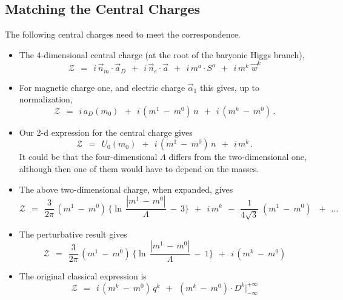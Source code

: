\documentclass[epsfig,12pt]{article}
\def\beq{\begin{equation}}
\def\eeq{\end{equation}}
\def\beq{\begin{equation}}
\def\eeq{\end{equation}}
\newcommand{\mc}[1]{\mathcal{#1}}
\begin{document}
\subsection{Matching the Central Charges}
\setcounter{equation}{0}

       The following central charges need to meet the correspondence.
\vspace{0.6cm}

\begin{itemize}
\item
       The 4-dimensional central charge (at the root of the baryonic Higgs branch),
\beq
       \mc{Z}  ~~=~~ i\, \vec{n}{}_m \cdot \vec{a}{}_D  ~~+~~ i\, \vec{n}{}_e \cdot \vec{a}  
               ~~+~~ i\, m^a \cdot S^a ~~+~~ i\, m^k \; \vec{w}^k
\eeq

\item
       For magnetic charge one, and electric charge $ \vec{\alpha}{}_1 $ this gives, up to normalization,
\beq
       \mc{Z}  ~~=~~ i\, a_D(m_0)  ~~+~~ i\, ( m^1 ~-~ m^0 )\, n ~~+~~ i\, ( m^k ~-~ m^0 )\,.
\eeq

\item
       Our 2-d expression for the central charge gives
\beq
       \mc{Z}  ~~=~~ U_0(m_0)      ~~+~~ i\, ( m^1 ~-~ m^0 )\, n ~~+~~ i\, m^k\,. 
\eeq
       It could be that the four-dimensional $ \Lambda $ differs from the two-dimensional one, although
       then one of them would have to depend on the masses.

\item
       The above two-dimensional charge, when expanded, gives
\beq
       \mc{Z} ~~=~~        
       \frac{3}{2\pi}\, (m^1 ~-~ m^0)\, \bigg\{ \ln\, \frac {   | m^1 \,-\, m^0 |   }
                                                            {        \Lambda        } ~-~ 3 \bigg\}
       ~~+~~ i\, m^k 
       ~~-~~ \frac{1}{4\sqrt{3}}\; ( m^1 ~-~ m^0 )\, 
       ~~+~~ ...
\eeq

\item
       The perturbative result gives 
\beq
       \mc{Z} ~~=~~        
       \frac{3}{2\pi}\, (m^1 ~-~ m^0)\, \bigg\{ \ln\, \frac {   | m^1 \,-\, m^0 |   }
                                                            {        \Lambda        } ~-~ 1 \bigg\}
       ~~+~~ i\, ( m^k ~-~ m^0)
\eeq

\item
       The original classical expression is
\beq
       \mc{Z} ~~=~~ i\, (m^k ~-~ m^0)\, q^k  ~~+~~ (m^k ~-~ m^0) \cdot D^k \Big|^{\scriptscriptstyle +\infty}_{\scriptscriptstyle -\infty}
\eeq
\end{itemize}
\end{document}
